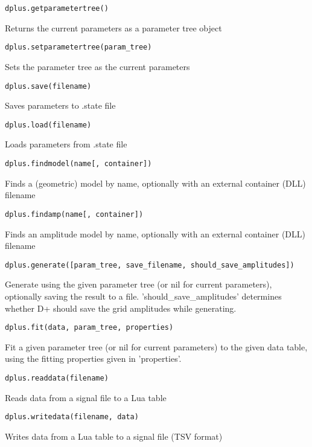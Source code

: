 \documentclass[../D+Manual.tex]{subfiles}
\begin{document}
\begin{lstlisting}
dplus.getparametertree()
\end{lstlisting}
Returns the current parameters as a parameter tree object

\begin{lstlisting}
dplus.setparametertree(param_tree)
\end{lstlisting}
Sets the parameter tree as the current parameters

\begin{lstlisting}
dplus.save(filename)
\end{lstlisting}
Saves parameters to .state file

\begin{lstlisting}
dplus.load(filename)
\end{lstlisting}
Loads parameters from .state file

\begin{lstlisting}
dplus.findmodel(name[, container])
\end{lstlisting}
Finds a (geometric) model by name, optionally with an external container (DLL) filename

\begin{lstlisting}
dplus.findamp(name[, container])
\end{lstlisting}
Finds an amplitude model by name, optionally with an external container (DLL) filename

\begin{lstlisting}
dplus.generate([param_tree, save_filename, should_save_amplitudes])
\end{lstlisting}
Generate using the given parameter tree (or nil for current parameters), optionally saving the result to a file. 'should\_save\_amplitudes' determines whether D+ should save the grid amplitudes while generating.

\begin{lstlisting}
dplus.fit(data, param_tree, properties)
\end{lstlisting}
Fit a given parameter tree (or nil for current parameters) to the given data table, using the fitting properties given in 'properties'.

\begin{lstlisting}
dplus.readdata(filename)
\end{lstlisting}
Reads data from a signal file to a Lua table

\begin{lstlisting}
dplus.writedata(filename, data)
\end{lstlisting}
Writes data from a Lua table to a signal file (TSV format)
\end{document}
